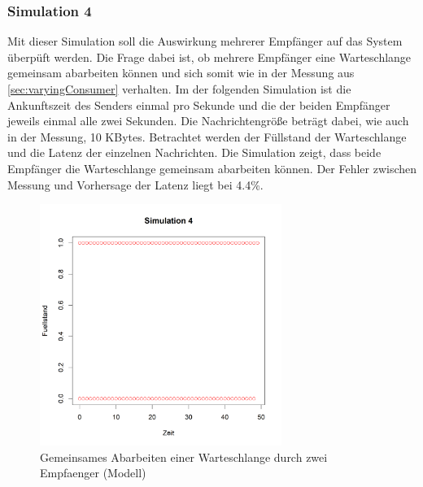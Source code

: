 \subsubsection{Simulation 4}
Mit dieser Simulation soll die Auswirkung mehrerer Empfänger auf das System überpüft werden. Die Frage dabei ist, ob mehrere Empfänger eine Warteschlange gemeinsam abarbeiten können und sich somit wie in der Messung aus \autoref{sec:varyingConsumer} verhalten. Im der folgenden Simulation ist die Ankunftszeit des Senders einmal pro Sekunde und die der beiden Empfänger jeweils einmal alle zwei Sekunden. Die Nachrichtengröße beträgt dabei, wie auch in der Messung, 10 KBytes. Betrachtet werden der Füllstand der Warteschlange und die Latenz der einzelnen Nachrichten. 
Die Simulation zeigt, dass beide Empfänger die Warteschlange gemeinsam abarbeiten können. Der Fehler zwischen Messung und Vorhersage der Latenz liegt bei 4.4\%. 

\begin{figure}
\center
  \includegraphics[width=0.7\textwidth]{images/modelSimulationResults/simulation4.png}
  \caption{Gemeinsames Abarbeiten einer Warteschlange durch zwei Empfaenger (Modell)}
  \label{img:simulation4}
\end{figure}



